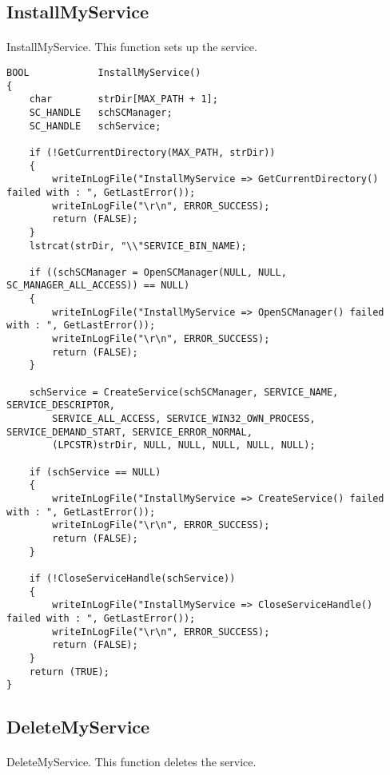 \documentclass{article}
\begin{document}

\newpage
\subsection{InstallMyService}
\paragraph{}
InstallMyService. This function sets up the service.

\begin{lstlisting}
BOOL			InstallMyService()
{
	char		strDir[MAX_PATH + 1];
	SC_HANDLE	schSCManager;
	SC_HANDLE	schService;

	if (!GetCurrentDirectory(MAX_PATH, strDir))
	{
		writeInLogFile("InstallMyService => GetCurrentDirectory() failed with : ", GetLastError());
		writeInLogFile("\r\n", ERROR_SUCCESS);
		return (FALSE);
	}
	lstrcat(strDir, "\\"SERVICE_BIN_NAME);

	if ((schSCManager = OpenSCManager(NULL, NULL, SC_MANAGER_ALL_ACCESS)) == NULL)
	{
		writeInLogFile("InstallMyService => OpenSCManager() failed with : ", GetLastError());
		writeInLogFile("\r\n", ERROR_SUCCESS);
		return (FALSE);
	}

	schService = CreateService(schSCManager, SERVICE_NAME, SERVICE_DESCRIPTOR,
		SERVICE_ALL_ACCESS, SERVICE_WIN32_OWN_PROCESS, SERVICE_DEMAND_START, SERVICE_ERROR_NORMAL,
		(LPCSTR)strDir, NULL, NULL, NULL, NULL, NULL);

	if (schService == NULL)
	{
		writeInLogFile("InstallMyService => CreateService() failed with : ", GetLastError());
		writeInLogFile("\r\n", ERROR_SUCCESS);
		return (FALSE);
	}

	if (!CloseServiceHandle(schService))
	{
		writeInLogFile("InstallMyService => CloseServiceHandle() failed with : ", GetLastError());
		writeInLogFile("\r\n", ERROR_SUCCESS);
		return (FALSE);
	}
	return (TRUE);
}

\end{lstlisting}

\newpage
\subsection{DeleteMyService}
\paragraph{}
DeleteMyService. This function deletes the service.
\end{document}
